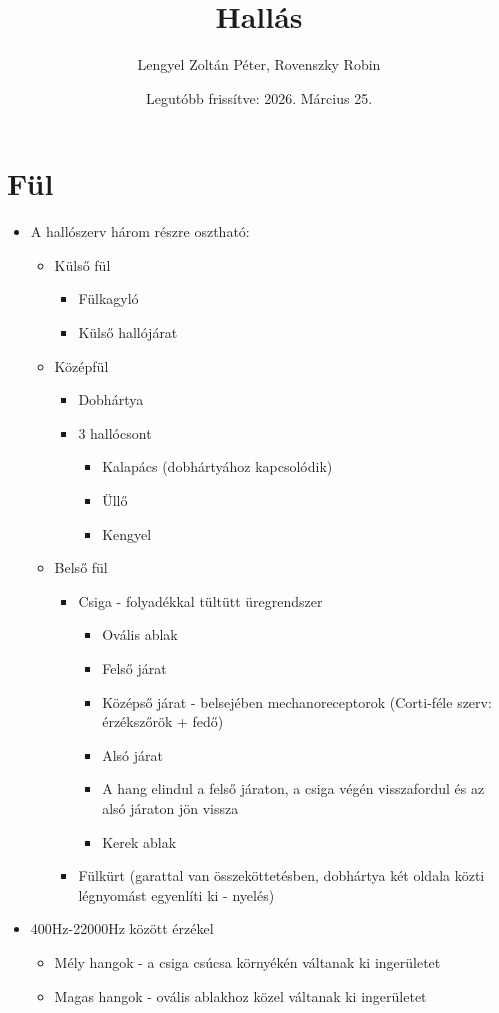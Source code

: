 \documentclass{article}
\title{Hallás}
\author{Lengyel Zoltán Péter, Rovenszky Robin}
\date{Legutóbb frissítve: 2026. Március 25.}
\begin{document}
\maketitle
\tableofcontents
\newpage

\section{Fül}
\begin{itemize}
    \item A hallószerv három részre osztható: 
    \begin{itemize}
        \item Külső fül \begin{itemize}
            \item Fülkagyló
            \item Külső hallójárat
        \end{itemize}
        \item Középfül \begin{itemize}
            \item Dobhártya 
            \item 3 hallócsont \begin{itemize}
                \item Kalapács (dobhártyához kapcsolódik)
                \item Üllő 
                \item Kengyel
            \end{itemize}
        \end{itemize}
        \item Belső fül \begin{itemize}
            \item Csiga - folyadékkal tültütt üregrendszer \begin{itemize}
                \item Ovális ablak
                \item Felső járat
                \item Középső járat -  belsejében mechanoreceptorok (Corti-féle szerv: érzékszőrök + fedő)
                \item Alsó járat
                \item A hang elindul a felső járaton, a csiga végén visszafordul és az alsó járaton jön vissza
                \item Kerek ablak
            \end{itemize}
            \item Fülkürt (garattal van összeköttetésben, dobhártya két oldala közti légnyomást egyenlíti ki - nyelés)
        \end{itemize}
    \end{itemize}

    \item 400Hz-22000Hz között érzékel \begin{itemize}
        \item Mély hangok - a csiga csúcsa környékén váltanak ki ingerületet
        \item Magas hangok -  ovális ablakhoz közel váltanak ki ingerületet
    \end{itemize}
\end{itemize}
\end{document}

